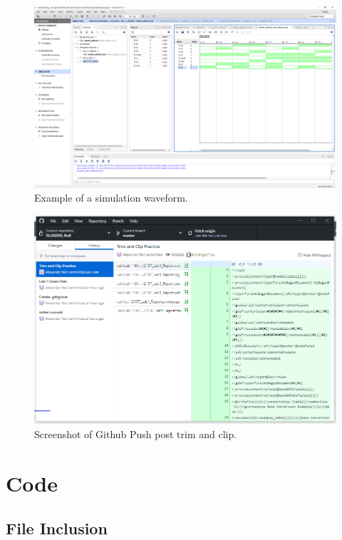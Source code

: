 \documentclass[11pt]{article}
\newcommand{\Verilog}[2][]{%
	
}
\begin{document}
\begin{figure}[ht]\centering
	\includegraphics[width=1\textwidth,trim=18cm 15.5cm .5cm 4.5cm,clip]{lab1_example_screenshot} \caption{Example of a simulation waveform.} 
	
\end{figure}	

\begin{figure}[ht]\centering
	\includegraphics[width=1\textwidth]{Git_Screenshot} \caption{Screenshot of Github Push post trim and clip.}
	
\end{figure}	
\clearpage

\section*{Code}

\subsection*{File Inclusion}\Verilog[caption=File-included Verilog code example,label=code:file_ex]{lab1_example_code.sv}
\end{document}
